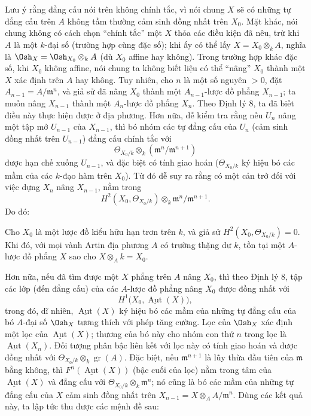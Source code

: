 Lưu ý rằng đẳng cấu nói trên không chính tắc, vì nói chung $X$ sẽ có những tự
đẳng cấu trên $A$ không tầm thường cảm sinh đồng nhất trên $X_0$. Mặt khác,
nói chung không có cách chọn “chính tắc” một $X$ thỏa các điều kiện đã nêu,
trừ khi $A$ là một $k$-đại số (trường hợp cùng đặc số); khi ấy có thể lấy
$X=X_0\otimes_k A$, nghĩa là $\Osh_X=\Osh_{X_0}\otimes_k A$ (dù $X_0$ affine
hay không). Trong trường hợp khác đặc số, khi $X_0$ không affine, nói chung ta
không biết liệu có thể “nâng” $X_0$ thành một $X$ xác định trên $A$ hay không.
Tuy nhiên, cho $n$ là một số nguyên $>0$, đặt
$A_{n-1}=A/\mathfrak m^n$, và giả sử đã nâng $X_0$ thành một
$A_{n-1}$-lược đồ phẳng $X_{n-1}$; ta muốn nâng $X_{n-1}$ thành một
$A_n$-lược đồ phẳng $X_n$. Theo Định lý 8, ta đã biết điều này thực hiện được
ở địa phương. Hơn nữa, dễ kiểm tra rằng nếu $U_n$ nâng một tập mở $U_{n-1}$
của $X_{n-1}$, thì bó nhóm các tự đẳng cấu của $U_n$ (cảm sinh đồng nhất trên
$U_{n-1}$) đẳng cấu chính tắc với
\[
  \Theta_{X_0/k}\otimes_k(\mathfrak m^n/\mathfrak m^{n+1})
\]
được hạn chế xuống $U_{n-1}$, và đặc biệt có tính giao hoán
($\Theta_{X_0/k}$ ký hiệu bó các mầm của các $k$-đạo hàm trên $X_0$). Từ đó
dễ suy ra rằng có một cản trở đối với việc dựng $X_n$ nâng $X_{n-1}$, nằm
trong
\[
  H^2(X_0,\Theta_{X_0/k})\otimes_k
  \mathfrak m^n/\mathfrak m^{n+1}.
\]
Do đó:

 Cho $X_0$ là một lược đồ kiểu hữu hạn trơn trên $k$, và
giả sử $H^2(X_0,\Theta_{X_0/k})=0$. Khi đó, với mọi vành Artin địa phương
$A$ có trường thặng dư $k$, tồn tại một $A$-lược đồ phẳng $X$ sao
cho $X\otimes_A k=X_0$.

Hơn nữa, nếu đã tìm được một $X$ phẳng trên $A$ nâng $X_0$, thì theo Định lý
8, tập các lớp (đến đẳng cấu) của các $A$-lược đồ phẳng nâng $X_0$ được đồng
nhất với
\[
  H^1\bigl(X_0,\underline{\operatorname{Aut}}(X)\bigr),
\]
trong đó, dĩ nhiên, $\underline{\operatorname{Aut}}(X)$ ký hiệu bó các mầm
của những tự đẳng cấu của bó $A$-đại số $\Osh_X$ tương thích với phép tăng
cường. Lọc của $\Osh_X$ xác định một lọc của
$\underline{\operatorname{Aut}}(X)$; thương của bó này cho nhóm con thứ
$n$ trong lọc là $\underline{\operatorname{Aut}}(X_n)$. Đối tượng phân bậc
liên kết với lọc này có tính giao hoán và được đồng nhất với
$\Theta_{X_0/k}\otimes_k\operatorname{gr}(A)$. Đặc biệt, nếu
$\mathfrak m^{n+1}$ là lũy thừa đầu tiên của $\mathfrak m$ bằng không, thì
$F^n(\underline{\operatorname{Aut}}(X))$ (bậc cuối của lọc) nằm trong tâm của
$\underline{\operatorname{Aut}}(X)$ và đẳng cấu với
$\Theta_{X_0/k}\otimes_k\mathfrak m^n$; nó cũng là bó các mầm của những tự
đẳng cấu của $X$ cảm sinh đồng nhất trên
$X_{n-1}=X\otimes_A A/\mathfrak m^n$. Dùng các kết quả này, ta lập tức thu
được các mệnh đề sau:

